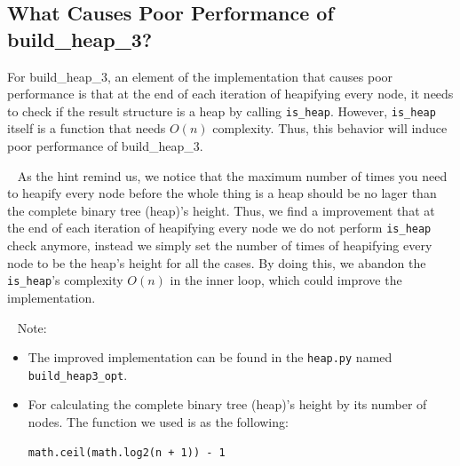 \documentclass[12pt]{article}
\begin{document}
\newpage
\subsection{What Causes Poor Performance of build\_heap\_3?}
For build\_heap\_3, an element of the implementation that causes poor performance is that at the end of each iteration of heapifying every node, it needs to check if the result structure is a heap by calling \verb|is_heap|. However, \verb|is_heap| itself is a function that needs $O(n)$ complexity. Thus, this behavior will induce poor performance of build\_heap\_3.

~\newline\noindent
As the hint remind us, we notice that the maximum number of times you need to heapify every node before the whole thing is a heap should be no lager than the complete binary tree (heap)'s height. Thus, we find a improvement that at the end of each iteration of heapifying every node we do not perform \verb|is_heap| check anymore, instead we simply set the number of times of heapifying every node to be the heap's height for all the cases. By doing this, we abandon the \verb|is_heap|'s complexity $O(n)$ in the inner loop, which could improve the implementation. 

~\newline\noindent
Note:
\begin{itemize}
\item The improved implementation can be found in the \verb|heap.py| named \verb|build_heap3_opt|.
\item For calculating the complete binary tree (heap)'s height by its number of nodes. The function we used is as the following:
\begin{lstlisting}
math.ceil(math.log2(n + 1)) - 1
\end{lstlisting}
\end{itemize}
\end{document}
